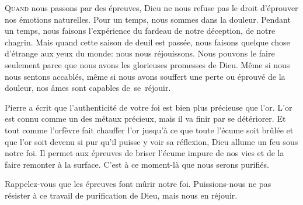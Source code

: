 
\lettrine{Q}{uand} nous passons par des épreuves, Dieu ne nous refuse pas
 le droit d'éprouver nos émotions naturelles. Pour un temps, nous sommes
 dans la douleur. Pendant un temps, nous faisons l'expérience du fardeau
 de notre déception, de notre chagrin. Mais quand cette saison de deuil
 est passée, nous faisons quelque chose d'étrange aux yeux du monde:
 nous nous réjouissons.
 Nous pouvons le faire seulement parce que nous avons les glorieuses
 promesses de Dieu. Même si nous nous sentons accablés,
 même si nous avons souffert une perte ou éprouvé de la douleur,
 nos âmes sont capables de~se~réjouir.


Pierre a écrit que l'authenticité de votre foi est bien plus précieuse que l'or.
 L'or est connu comme un des métaux précieux, mais il va finir par se détériorer.
 Et tout comme l'orfèvre fait chauffer l'or jusqu'à ce que toute l'écume
 soit brûlée et que l'or soit devenu si pur qu'il puisse y voir sa réflexion,
 Dieu allume un feu sous notre foi. Il permet aux épreuves de briser l'écume
 impure de nos vies et de la faire remonter à la surface.
 C'est à ce moment-là que nous serons purifiés.

Rappelez-vous que les épreuves font mûrir notre foi.
 Puissions-nous ne pas résister à ce travail de purification de Dieu,
 mais nous en réjouir.

\dvrule






